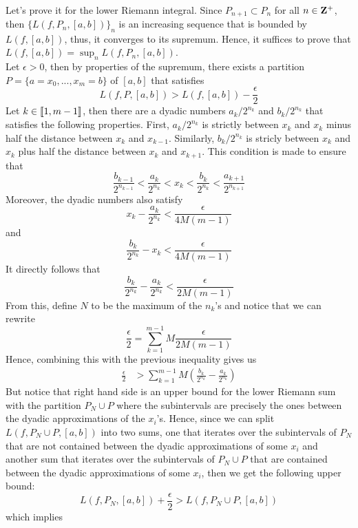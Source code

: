 \begin{solution}
    \\ Let's prove it for the lower Riemann integral. Since $P_{n+1} \subset P_n$ for all $n \in \mathbf{Z}^+$, then $\{L(f, P_n, [a,b])\}_n$ is an increasing sequence that is bounded by $L(f, [a,b])$, thus, it converges to its supremum. Hence, it suffices to prove that $L(f, [a,b]) = \sup_n L(f, P_n, [a,b])$. \\
    Let $\epsilon > 0$, then by properties of the supremum, there exists a partition $P = \{a=x_0, ..., x_m=b\}$ of $[a,b]$ that satisfies 
    $$L(f, P, [a,b]) > L(f, [a,b]) - \frac{\epsilon}{2}$$
    Let $k \in \llbracket 1 , m-1 \rrbracket$, then there are a dyadic numbers $a_k / 2^{n_k}$ and $b_k / 2^{n_k}$ that satisfies the following properties. First, $a_k / 2^{n_k}$ is strictly between $x_k$ and $x_k$ minus half the distance between $x_k$ and $x_{k-1}$. Similarly, $b_k / 2^{n_k}$ is stricly between $x_k$ and $x_k$ plus half the distance between $x_k$ and $x_{k+1}$. This condition is made to ensure that $$\frac{b_{k-1}}{2^{n_{k-1}}} < \frac{a_k}{2^{n_k}} < x_k < \frac{b_k}{2^{n_k}} < \frac{a_{k+1}}{2^{n_{k+1}}}$$
    Moreover, the dyadic numbers also satisfy
    $$x_k - \frac{a_k}{2^{n_k}} < \frac{\epsilon}{4M(m-1)}$$
    and 
    $$\frac{b_k}{2^{n_k}} - x_k < \frac{\epsilon}{4M(m-1)}$$
    It directly follows that
    $$\frac{b_k}{2^{n_k}} - \frac{a_k}{2^{n_k}} < \frac{\epsilon}{2M(m-1)}$$
    From this, define $N$ to be the maximum of the $n_k$'s and notice that we can rewrite 
    $$\frac{\epsilon}{2} = \sum_{k=1}^{m-1}M\frac{\epsilon}{2M(m-1)}$$
    Hence, combining this with the previous inequality gives us
    \begin{align*}
        \frac{\epsilon}{2} &> \sum_{k=1}^{m-1}M\left(\frac{b_k}{2^{n_k}} - \frac{a_k}{2^{n_k}}\right)
    \end{align*}
    But notice that right hand side is an upper bound for the lower Riemann sum with the partition $P_N \cup P$ where the subintervals are precisely the ones between the dyadic approximations of the $x_i$'s. Hence, since we can split $L(f, P_N \cup P, [a,b])$ into two sums, one that iterates over the subintervals of $P_N$ that are not contained between the dyadic approximations of some $x_i$ and another sum that iterates over the subintervals of $P_N \cup P$ that are contained between the dyadic approximations of some $x_i$, then we get the following upper bound:
    $$L(f, P_N, [a,b]) + \frac{\epsilon}{2} > L(f, P_N\cup P, [a,b])$$
    which implies 
    \begin{align*}

\end{align*}
\end{solution}
